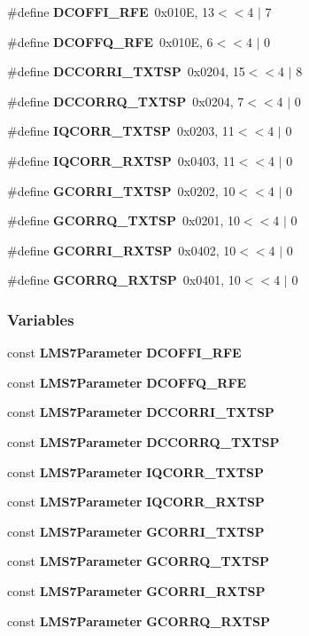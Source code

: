\begin{DoxyCompactItemize}
\item 
\#define {\bf D\+C\+O\+F\+F\+I\+\_\+\+R\+FE}~0x010\+E, 13$<$$<$4 $\vert$ 7
\item 
\#define {\bf D\+C\+O\+F\+F\+Q\+\_\+\+R\+FE}~0x010\+E, 6$<$$<$4 $\vert$ 0
\item 
\#define {\bf D\+C\+C\+O\+R\+R\+I\+\_\+\+T\+X\+T\+SP}~0x0204, 15$<$$<$4 $\vert$ 8
\item 
\#define {\bf D\+C\+C\+O\+R\+R\+Q\+\_\+\+T\+X\+T\+SP}~0x0204, 7$<$$<$4 $\vert$ 0
\item 
\#define {\bf I\+Q\+C\+O\+R\+R\+\_\+\+T\+X\+T\+SP}~0x0203, 11$<$$<$4 $\vert$ 0
\item 
\#define {\bf I\+Q\+C\+O\+R\+R\+\_\+\+R\+X\+T\+SP}~0x0403, 11$<$$<$4 $\vert$ 0
\item 
\#define {\bf G\+C\+O\+R\+R\+I\+\_\+\+T\+X\+T\+SP}~0x0202, 10$<$$<$4 $\vert$ 0
\item 
\#define {\bf G\+C\+O\+R\+R\+Q\+\_\+\+T\+X\+T\+SP}~0x0201, 10$<$$<$4 $\vert$ 0
\item 
\#define {\bf G\+C\+O\+R\+R\+I\+\_\+\+R\+X\+T\+SP}~0x0402, 10$<$$<$4 $\vert$ 0
\item 
\#define {\bf G\+C\+O\+R\+R\+Q\+\_\+\+R\+X\+T\+SP}~0x0401, 10$<$$<$4 $\vert$ 0
\end{DoxyCompactItemize}
\subsubsection*{Variables}
\begin{DoxyCompactItemize}
\item 
const {\bf L\+M\+S7\+Parameter} {\bf D\+C\+O\+F\+F\+I\+\_\+\+R\+FE}
\item 
const {\bf L\+M\+S7\+Parameter} {\bf D\+C\+O\+F\+F\+Q\+\_\+\+R\+FE}
\item 
const {\bf L\+M\+S7\+Parameter} {\bf D\+C\+C\+O\+R\+R\+I\+\_\+\+T\+X\+T\+SP}
\item 
const {\bf L\+M\+S7\+Parameter} {\bf D\+C\+C\+O\+R\+R\+Q\+\_\+\+T\+X\+T\+SP}
\item 
const {\bf L\+M\+S7\+Parameter} {\bf I\+Q\+C\+O\+R\+R\+\_\+\+T\+X\+T\+SP}
\item 
const {\bf L\+M\+S7\+Parameter} {\bf I\+Q\+C\+O\+R\+R\+\_\+\+R\+X\+T\+SP}
\item 
const {\bf L\+M\+S7\+Parameter} {\bf G\+C\+O\+R\+R\+I\+\_\+\+T\+X\+T\+SP}
\item 
const {\bf L\+M\+S7\+Parameter} {\bf G\+C\+O\+R\+R\+Q\+\_\+\+T\+X\+T\+SP}
\item 
const {\bf L\+M\+S7\+Parameter} {\bf G\+C\+O\+R\+R\+I\+\_\+\+R\+X\+T\+SP}
\item 
const {\bf L\+M\+S7\+Parameter} {\bf G\+C\+O\+R\+R\+Q\+\_\+\+R\+X\+T\+SP}
\end{DoxyCompactItemize}


